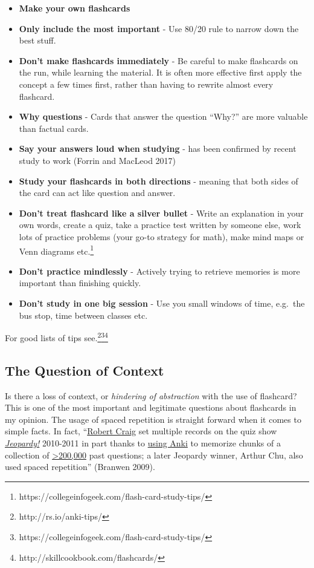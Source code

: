 \begin{itemize}
\tightlist
\item
  \textbf{Make your own flashcards}
\item
  \textbf{Only include the most important} - Use 80/20 rule to narrow
  down the best stuff.
\item
  \textbf{Don't make flashcards immediately} - Be careful to make
  flashcards on the run, while learning the material. It is often more
  effective first apply the concept a few times first, rather than
  having to rewrite almost every flashcard.
\item
  \textbf{Why questions} - Cards that answer the question ``Why?'' are
  more valuable than factual cards.
\item
  \textbf{Say your answers loud when studying} - has been confirmed by
  recent study to work (Forrin and MacLeod 2017)
\item
  \textbf{Study your flashcards in both directions} - meaning that both
  sides of the card can act like question and answer.
\item
  \textbf{Don't treat flashcard like a silver bullet} - Write an
  explanation in your own words, create a quiz, take a practice test
  written by someone else, work lots of practice problems (your go-to
  strategy for math), make mind maps or Venn diagrams etc.\footnote{https://collegeinfogeek.com/flash-card-study-tips/}
\item
  \textbf{Don't practice mindlessly} - Actively trying to retrieve
  memories is more important than finishing quickly.
\item
  \textbf{Don't study in one big session} - Use you small windows of
  time, e.g.~the bus stop, time between classes etc.
\end{itemize}

For good lists of tips see.\footnote{http://rs.io/anki-tips/}\footnote{https://collegeinfogeek.com/flash-card-study-tips/}\footnote{http://skillcookbook.com/flashcards/}

\hypertarget{the-question-of-context}{\subsection{The Question of
Context}\label{the-question-of-context}}

Is there a loss of context, or \emph{hindering of abstraction} with the
use of flashcard? This is one of the most important and legitimate
questions about flashcards in my opinion. The usage of spaced repetition
is straight forward when it comes to simple facts. In fact,
``\href{https://en.wikipedia.org/wiki/Roger\%20Craig\%20\%28Jeopardy\%21\%20contestant\%29}{Robert
Craig} set multiple records on the quiz show
\href{https://en.wikipedia.org/wiki/Jeopardy\%21}{\emph{Jeopardy!}}
2010-2011 in part thanks to
\href{http://quantifiedself.com/2011/09/roger-craig-on-knowledge-tracking/\#comment-3004}{using
Anki} to memorize chunks of a collection of
\href{http://www.j-archive.com/}{\textgreater{}200,000} past questions;
a later Jeopardy winner, Arthur Chu, also used spaced repetition''
(Branwen 2009).

